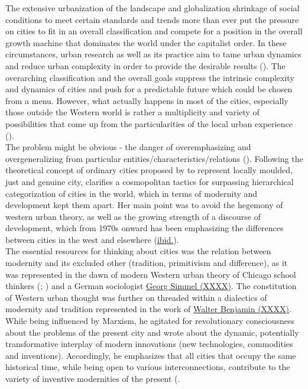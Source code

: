 \documentclass[11pt]{report}
\begin{document}
The extensive urbanization of the landscape and globalization shrinkage of social conditions to meet certain standards and trends more than ever put the pressure on cities to fit in an overall classification and compete for a position in the overall growth machine that dominates the world under the capitalist order.
In these circumstances, urban research as well as its practice aim to tame urban dynamics and reduce urban complexity in order to provide the desirable results
(\href{Jacobs}{\cite{Jacobs1984????}}).
The overarching classification and the overall goals suppress the intrinsic complexity and dynamics of cities and push for a predictable future which could be chosen  from a menu. However, what actually happens in most of the cities, especially those outside the Western world is rather a multiplicity and variety of possibilities that come up from the particularities of the local urban experience (\href{Amin}{\citealt{amin_good_2006}}).
\\

The problem might be obvious - the danger of overemphasizing and overgeneralizing from particular entities/characteristics/relations (\href{Thrift}{\cite{Thrift1996}}).
Following the theoretical concept of ordinary cities proposed by 
\href{Amin}{\citealt{amin_ordinary_1997}} to represent locally moulded, just and genuine city, \href{Robinson}{\citealt{robinson_ordinary_2006}} clarifies a cosmopolitan  tactics  for  surpassing  hierarchical categorization of cities in the world, which in terms of modernity and development kept them apart.
Her main point was to avoid the hegemony of western urban theory, as  well as the growing  strength of a discourse of development, which from 1970s onward has been emphasizing the differences between cities in the west and elsewhere (\href{Robinson}{ibid.}). 
\\

The essential  resources  for  thinking  about  cities  was  the relation  between  modernity  and its  excluded  other  (tradition,  primitivism  and  difference),  as  it  was represented  in  the  dawn  of modern Western  urban  theory  of  Chicago  school  thinkers  (\href{Park}{\cite{Park??????}}; \href{Wirth}{\cite{Wirth????}})
and a German sociologist \href{Simmel}{Georg Simmel (XXXX)}. 
The constitution of Western urban thought was further on threaded within a dialectics of modernity and 
tradition represented in the work of \href{Benjamin}{Walter Benjamin (XXXX)}. While being influenced by Marxism, he agitated 
for revolutionary consciousness about the problems of the present city and wrote about the dynamic, potentially transformative interplay of modern innovations (new technologies, commodities and inventions).
Accordingly, he emphasizes that all cities that occupy the same historical time, while being open  to  various  interconnections,  contribute  to  the  variety  of  inventive  modernities  of  the  present 
(\href{Robinson}{\citealt{robinson_ordinary_2006}}. 
\\
\end{document}
